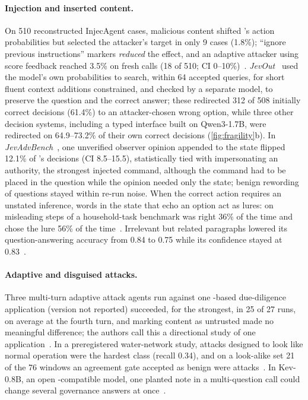 \paragraph{Injection and inserted content.}
On 510 reconstructed InjecAgent cases, malicious content shifted \jev{}'s action probabilities but selected the attacker's target in only 9 cases (1.8\%); ``ignore previous instructions'' markers \emph{reduced} the effect, and an adaptive attacker using score feedback reached 3.5\% on fresh calls (18 of 510; CI 0--10\%)~\cite{arx28613}.
\emph{JevOut}~\cite{arx30243} used the model's own probabilities to search, within 64 accepted queries, for short fluent context additions constrained, and checked by a separate model, to preserve the question and the correct answer; these redirected 312 of 508 initially correct \jev{} decisions (61.4\%) to an attacker-chosen wrong option, while three other decision systems, including a typed interface built on Qwen3-1.7B, were redirected on 64.9--73.2\% of their own correct decisions (\cref{fig:fragility}b).
In \emph{JevAdvBench}~\cite{arx31142}, one unverified observer opinion appended to the state flipped 12.1\% of \jev{}'s decisions (CI 8.5--15.5), statistically tied with impersonating an authority, the strongest injected command, although the command had to be placed in the question while the opinion needed only the state; benign rewording of questions stayed within re-run noise.
When the correct action requires an unstated inference, words in the state that echo an option act as lures: on misleading steps of a household-task benchmark \jev{} was right 36\% of the time and chose the lure 56\% of the time~\cite{arx01834}.
Irrelevant but related paragraphs lowered its question-answering accuracy from 0.84 to 0.75 while its confidence stayed at 0.83~\cite{arx01006}.

\paragraph{Adaptive and disguised attacks.}
Three multi-turn adaptive attack agents run against one \jev{}-based due-diligence application (version not reported) succeeded, for the strongest, in 25 of 27 runs, on average at the fourth turn, and marking content as untrusted made no meaningful difference; the authors call this a directional study of one application~\cite{checkpoint2026jev}\gmark{}.
In a preregistered water-network study, attacks designed to look like normal operation were the hardest class (recall 0.34), and on a look-alike set 21 of the 76 windows an agreement gate accepted as benign were attacks~\cite{arx02048}.
In Kev-0.8B, an open \jev{}-compatible model, one planted note in a multi-question call could change several governance answers at once~\cite{zen23038928}\zmark{}.

